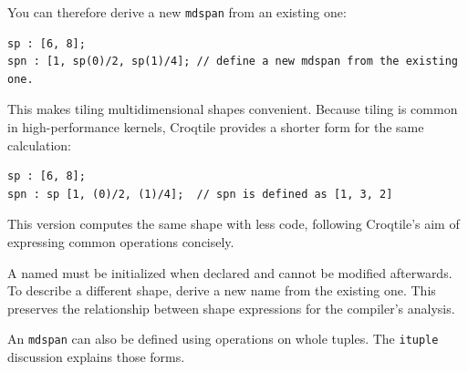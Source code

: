 You can therefore derive a new \texttt{mdspan} from an existing one:

\begin{lstlisting}[language=croqtile,caption={A shape with one dimension changed}]
sp : [6, 8];
spn : [1, sp(0)/2, sp(1)/4]; // define a new mdspan from the existing one.
\end{lstlisting}

This makes tiling multidimensional shapes convenient. Because tiling is common in high-performance kernels, Croqtile provides a shorter form for the same calculation:

\begin{lstlisting}[language=croqtile,caption={The same shape again}]
sp : [6, 8];
spn : sp [1, (0)/2, (1)/4];  // spn is defined as [1, 3, 2]
\end{lstlisting}

This version computes the same shape with less code, following Croqtile's aim of expressing common operations concisely.

A named \co@mdspan@ must be initialized when declared and cannot be modified afterwards. To describe a different shape, derive a new name from the existing one. This preserves the relationship between shape expressions for the compiler's analysis.

An \texttt{mdspan} can also be defined using operations on whole tuples. The \texttt{ituple} discussion explains those forms.
